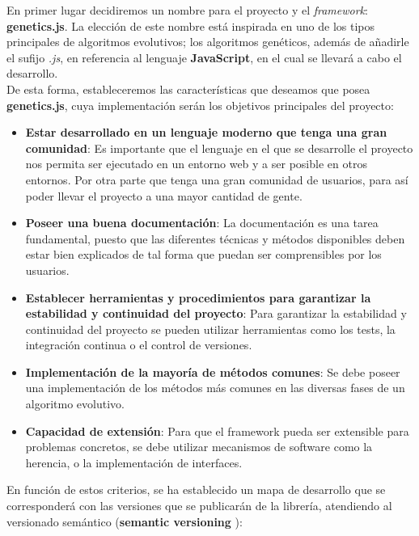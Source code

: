 En primer lugar decidiremos un nombre para el proyecto y el \textit{framework}: \textbf{genetics.js}. La elección de este nombre está inspirada en uno de los tipos principales de algoritmos evolutivos; los algoritmos genéticos, además de añadirle el sufijo \textit{.js}, en referencia al lenguaje \textbf{JavaScript}, en el cual se llevará a cabo el desarrollo. \\

De esta forma, estableceremos las características que deseamos que posea \textbf{genetics.js}, cuya implementación serán los objetivos principales del proyecto:

\begin{itemize}
    \item \textbf{Estar desarrollado en un lenguaje moderno que tenga una gran comunidad}: Es importante que el lenguaje en el que se desarrolle el proyecto nos permita ser ejecutado en un entorno web y a ser posible en otros entornos. Por otra parte que tenga una gran comunidad de usuarios, para así poder llevar el proyecto a una mayor cantidad de gente.
    \item \textbf{Poseer una buena documentación}: La documentación es una tarea fundamental, puesto que las diferentes técnicas y métodos disponibles deben estar bien explicados de tal forma que puedan ser comprensibles por los usuarios.
    \item \textbf{Establecer herramientas y procedimientos para garantizar la estabilidad y continuidad del proyecto}: Para garantizar la estabilidad y continuidad del proyecto se pueden utilizar herramientas como los tests, la integración continua o el control de versiones.
    \item \textbf{Implementación de la mayoría de métodos comunes}: Se debe poseer una implementación de los métodos más comunes en las diversas fases de un algoritmo evolutivo.
    \item \textbf{Capacidad de extensión}: Para que el framework pueda ser extensible para problemas concretos, se debe utilizar mecanismos de software como la herencia, o la implementación de interfaces.
\end{itemize}

En función de estos criterios, se ha establecido un mapa de desarrollo que se corresponderá con las versiones que se publicarán de la librería, atendiendo al versionado semántico (\textbf{semantic versioning} \cite{semver}):

